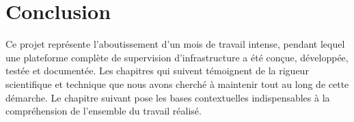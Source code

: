 \section*{Conclusion}

Ce projet représente l'aboutissement d'un mois de travail intense, pendant lequel
une plateforme complète de supervision d'infrastructure a été conçue, développée,
testée et documentée. Les chapitres qui suivent témoignent de la rigueur
scientifique et technique que nous avons cherché à maintenir tout au long de cette
démarche. Le chapitre suivant pose les bases contextuelles indispensables à la
compréhension de l'ensemble du travail réalisé.
